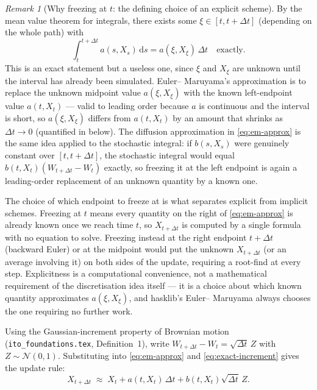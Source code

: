 \documentclass[11pt]{article}
\newcommand{\dd}{\mathrm{d}}
\newcommand{\drift}{a}
\newcommand{\diff}{b}
\theoremstyle{plain}
\theoremstyle{definition}
\theoremstyle{remark}
\newtheorem{remark}{Remark}
\begin{document}
\begin{remark}[Why freezing at $t$: the defining choice of an explicit scheme]
By the mean value theorem for integrals, there exists some
$\xi\in[t,t+\Delta t]$ (depending on the whole path) with
\[
   \int_t^{t+\Delta t}\drift(s,X_s)\,\dd s = \drift(\xi,X_\xi)\,\Delta t
   \quad\text{exactly.}
\]
This is an exact statement but a useless one, since $\xi$ and $X_\xi$
are unknown until the interval has already been simulated. Euler--
Maruyama's approximation is to replace the unknown midpoint value
$\drift(\xi,X_\xi)$ with the known left-endpoint value
$\drift(t,X_t)$ --- valid to leading order because $\drift$ is
continuous and the interval is short, so $\drift(\xi,X_\xi)$ differs
from $\drift(t,X_t)$ by an amount that shrinks as $\Delta t\to0$
(quantified in  below). The diffusion
approximation in \eqref{eq:em-approx} is the same idea applied to the
stochastic integral: if $\diff(s,X_s)$ were genuinely constant over
$[t,t+\Delta t]$, the stochastic integral would equal
$\diff(t,X_t)(W_{t+\Delta t}-W_t)$ exactly, so freezing it at
the left endpoint is again a leading-order replacement of an unknown
quantity by a known one.

The choice of which endpoint to freeze at is what separates
explicit from implicit schemes. Freezing at $t$ means every quantity
on the right of \eqref{eq:em-approx} is already known once we reach
time $t$, so $X_{t+\Delta t}$ is computed by a single formula with no
equation to solve. Freezing instead at the right endpoint
$t+\Delta t$ (backward Euler) or at the midpoint would put the unknown
$X_{t+\Delta t}$ (or an average involving it) on both sides of the
update, requiring a root-find at every step. Explicitness is a
computational convenience, not a mathematical requirement of the
discretisation idea itself --- it is a choice about which known
quantity approximates $\drift(\xi,X_\xi)$, and hasklib's Euler--
Maruyama always chooses the one requiring no further work.
\end{remark}

Using the Gaussian-increment property of Brownian motion
(\texttt{ito\_foundations.tex}, Definition~1), write
$W_{t+\Delta t}-W_t = \sqrt{\Delta t}\,Z$ with $Z\sim\mathcal N(0,1)$.
Substituting into \eqref{eq:em-approx} and \eqref{eq:exact-increment}
gives the update rule:
\begin{equation}\label{eq:em-update}
   X_{t+\Delta t} \;\approx\; X_t + \drift(t,X_t)\,\Delta t
                    + \diff(t,X_t)\sqrt{\Delta t}\,Z.
\end{equation}
\end{document}
